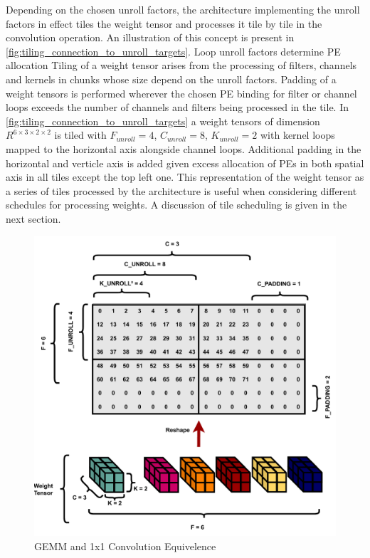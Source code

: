 Depending on the chosen unroll factors, the architecture implementing the unroll
factors in effect tiles the weight tensor and processes it tile by tile in the
convolution operation. An
illustration of this concept is present in
\autoref{fig:tiling_connection_to_unroll_targets}. Loop unroll factors determine
PE allocation 
Tiling of a weight tensor arises from the processing of filters, channels and
kernels in chunks whose size depend on the unroll factors. 
Padding of a weight tensors is performed wherever the chosen PE
binding for filter or channel loops exceeds the number of channels and filters
being processed in the tile. In
\autoref{fig:tiling_connection_to_unroll_targets} a weight tensors of dimension
$R^{6\times 3\times 2\times 2}$ is tiled with $F_{unroll} = 4$, $C_{unroll}=8$,
$K_{unroll}=2$ with kernel loops mapped to the horizontal axis alongside channel
loops. Additional padding in the horizontal and verticle axis is added given
excess allocation of PEs in both spatial axis in all tiles except the top left
one. This representation of the weight tensor as a series of tiles processed by
the architecture is useful when considering different schedules for processing
weights. A discussion of tile scheduling is given in the next section. 

\begin{figure}[]
    \centering
    \includegraphics[scale=0.5]{fig/tiling.pdf}
    \caption{\ac{GEMM} and 1x1 Convolution Equivelence}
    \label{fig:tiling_connection_to_unroll_targets}
\end{figure}

